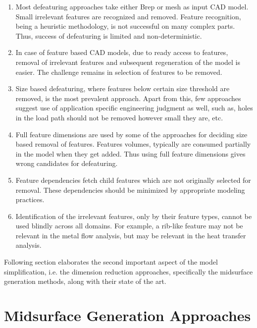 \begin{enumerate}[noitemsep,topsep=2pt,parsep=2pt,partopsep=2pt]
	\item Most defeaturing approaches take either Brep or mesh as input CAD model. Small irrelevant features are recognized and removed. Feature recognition, being a heuristic methodology, is not successful on many complex parts. Thus, success of defeaturing is limited and non-deterministic.
	\item In case of feature based CAD models, due to ready access to features, removal of irrelevant features and subsequent regeneration of the model is easier. The challenge remains in selection of features to be removed.
	\item Size based defeaturing, where features below certain size threshold are removed, is the most prevalent approach. Apart from this, few approaches suggest use of application specific engineering judgment as well, such as, holes in the load path should not be removed however small they are, etc.
	\item Full feature dimensions are used by some of the approaches for deciding size based removal of features. Features volumes, typically are consumed partially in the model when they get added. Thus using full feature dimensions gives wrong candidates for defeaturing.
	\item Feature dependencies fetch child features which are not originally selected for removal. These dependencies should be minimized by appropriate modeling practices.
\item Identification of the irrelevant features, only by their feature types, cannot be used blindly across all domains. For example, a rib-like feature may not be relevant in the metal flow analysis, but may be relevant in the heat transfer analysis. 
\end{enumerate}


Following section elaborates the second important aspect of the model simplification, i.e. the dimension reduction approaches, specifically the midsurface generation methods, along with their state of the art.

\section{Midsurface Generation Approaches}

